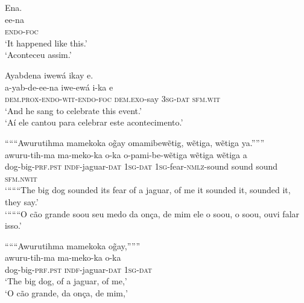 \documentclass[output=paper,
modfonts,nonflat
]{langsci/langscibook}
\begin{document}
  
\ea Ena.\\[.3em]
\gll ee-na\\
\textsc{endo-foc}\\
\glt ‘It happened like this.’\\
\glt ‘Aconteceu assim.’\\
\z

\newpage
\ea Ayabdena iwewá ikay e.\\[.3em]
\gll a-yab-de-ee-na iwe-ewá{\footnotemark} i-ka e\\
\textsc{dem.prox-endo-wit-endo-foc} \textsc{dem.exo}-say \textsc{3sg-dat} \textsc{sfm.wit}\\
\glt ‘And he sang to celebrate this event.’\\
\glt ‘Aí ele cantou para celebrar este acontecimento.’\\
\z

\ea “““Awurutihma mamekoka o\~{g}ay omamibewẽtig, wẽtiga, wẽtiga ya.”””{\footnotemark}\\[.3em]
\gll awuru-tih{\footnotemark}-ma ma-meko-ka o-ka o-pami-be-wẽtiga wẽtiga wẽtiga a{\footnotemark}\\
dog-big-\textsc{prf.pst} \textsc{indf}-jaguar-\textsc{dat} \textsc{1sg-dat} \textsc{1sg}-fear-\textsc{nmlz}-sound sound sound \textsc{sfm.nwit} \\
\glt ‘“““The big dog sounded its fear of a jaguar, of me it sounded it, sounded it, they say.’\\
\glt ‘“““O cão grande soou seu medo da onça, de mim ele o soou, o soou, ouvi falar isso.’\\
\fnminus
\fnminus
{}
\fnplus
{}
\fnplus
{}
\z

\ea “““Awurutihma mamekoka o\~{g}ay,”””\\[.3em]
\gll awuru-tih-ma ma-meko-ka o-ka\\
dog-big-\textsc{prf.pst} \textsc{indf}-jaguar-\textsc{dat} \textsc{1sg-dat}\\
\glt ‘The big dog, of a jaguar, of me,’\\
\glt ‘O cão grande, da onça, de mim,’\\
\z
\end{document}
